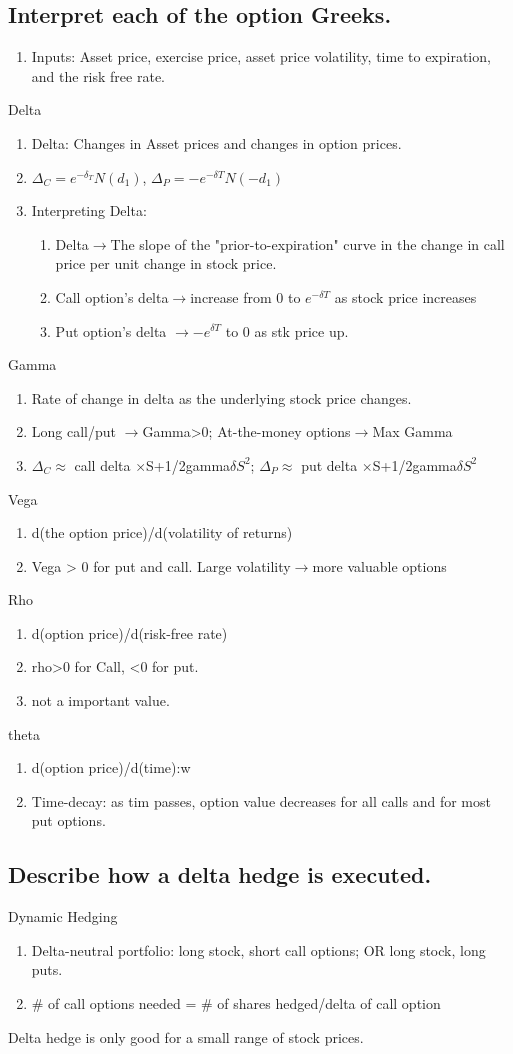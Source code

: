\documentclass{article}
\newcommand{\be}{\begin{enumerate}}
\newcommand{\ee}{\end{enumerate}}
\newcommand{\ra}{$\rightarrow$}
\begin{document}
\subsection{Interpret each of the option Greeks.}
\be
    \item Inputs: Asset price, exercise price, asset price volatility, time to expiration, and
    the risk free rate.
\ee
Delta
\be
    \item Delta: Changes in Asset prices and changes in option prices. 
    \item $\Delta_C=e^{-\delta_T}N(d_1)$, $\Delta_P=-e^{-\delta T}N(-d_1)$
    \item Interpreting Delta:
    \be
        \item Delta\ra The slope of the "prior-to-expiration" curve in the change in call
        price per unit change in stock price.
        \item Call option's delta\ra increase from 0 to $e^{-\delta T}$ as stock price increases
        \item Put option's delta \ra $-e^{\delta T}$ to 0 as stk price up.
    \ee
\ee
Gamma
\be
    \item Rate of change in delta as the underlying stock price changes.
    \item Long call/put \ra Gamma>0; At-the-money options\ra Max Gamma
    \item $\Delta_C\approx$ call delta $\times$S+1/2gamma$\delta S^2$;
    $\Delta_P\approx$ put delta $\times$S+1/2gamma$\delta S^2$ 
\ee
Vega
\be
    \item d(the option price)/d(volatility of returns)
    \item Vega > 0 for put and call. Large volatility\ra more valuable options
\ee
Rho
\be
    \item d(option price)/d(risk-free rate)
    \item rho>0 for Call, <0 for put.
    \item not a important value.
\ee
theta
\be
    \item d(option price)/d(time):w
    \item Time-decay: as tim passes, option value decreases for all calls and
    for most put options.
\ee
\subsection{Describe how a delta hedge is executed.}
Dynamic Hedging
\be
    \item Delta-neutral portfolio: long stock, short call options; OR long stock, long puts.
    \item \# of call options needed = \# of shares hedged/delta of call option
\ee
Delta hedge is only good for a small range of stock prices.
\end{document}
